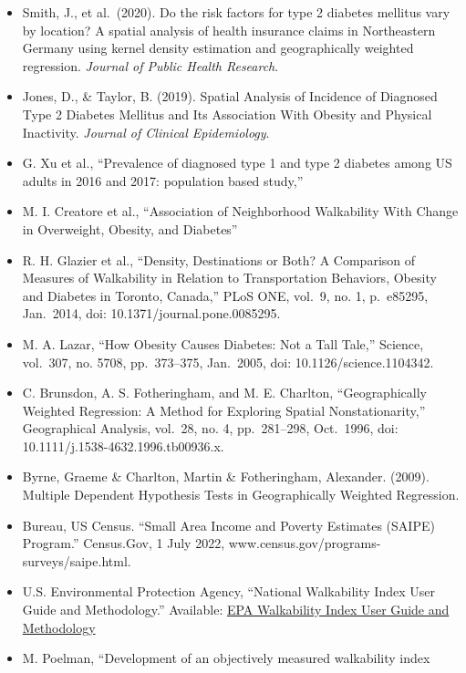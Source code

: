 \documentclass[
]{article}
\providecommand{\tightlist}{%
  \setlength{\itemsep}{0pt}\setlength{\parskip}{0pt}}\usepackage{longtable,booktabs,array}
\begin{document}
\begin{itemize}
\tightlist
\item
  Smith, J., et al.~(2020). Do the risk factors for type 2 diabetes
  mellitus vary by location? A spatial analysis of health insurance
  claims in Northeastern Germany using kernel density estimation and
  geographically weighted regression. \emph{Journal of Public Health
  Research}.
\item
  Jones, D., \& Taylor, B. (2019). Spatial Analysis of Incidence of
  Diagnosed Type 2 Diabetes Mellitus and Its Association With Obesity
  and Physical Inactivity. \emph{Journal of Clinical Epidemiology}.
\item
  G. Xu et al., ``Prevalence of diagnosed type 1 and type 2 diabetes
  among US adults in 2016 and 2017: population based study,''
\item
  M. I. Creatore et al., ``Association of Neighborhood Walkability With
  Change in Overweight, Obesity, and Diabetes''
\item
  R. H. Glazier et al., ``Density, Destinations or Both? A Comparison of
  Measures of Walkability in Relation to Transportation Behaviors,
  Obesity and Diabetes in Toronto, Canada,'' PLoS ONE, vol.~9, no. 1,
  p.~e85295, Jan.~2014, doi: 10.1371/journal.pone.0085295.
\item
  M. A. Lazar, ``How Obesity Causes Diabetes: Not a Tall Tale,''
  Science, vol.~307, no. 5708, pp.~373--375, Jan.~2005, doi:
  10.1126/science.1104342.
\item
  C. Brunsdon, A. S. Fotheringham, and M. E. Charlton, ``Geographically
  Weighted Regression: A Method for Exploring Spatial Nonstationarity,''
  Geographical Analysis, vol.~28, no. 4, pp.~281--298, Oct.~1996, doi:
  10.1111/j.1538-4632.1996.tb00936.x.
\item
  Byrne, Graeme \& Charlton, Martin \& Fotheringham, Alexander. (2009).
  Multiple Dependent Hypothesis Tests in Geographically Weighted
  Regression.
\item
  Bureau, US Census. ``Small Area Income and Poverty Estimates (SAIPE)
  Program.'' Census.Gov, 1 July 2022,
  www.census.gov/programs-surveys/saipe.html.
\item
  U.S. Environmental Protection Agency, ``National Walkability Index
  User Guide and Methodology.'' Available:
  \href{https://www.epa.gov/smartgrowth/national-walkability-index-user-guide-and-methodology}{EPA
  Walkability Index User Guide and Methodology}
\item
  M. Poelman, ``Development of an objectively measured walkability index

\end{itemize}
\end{document}
